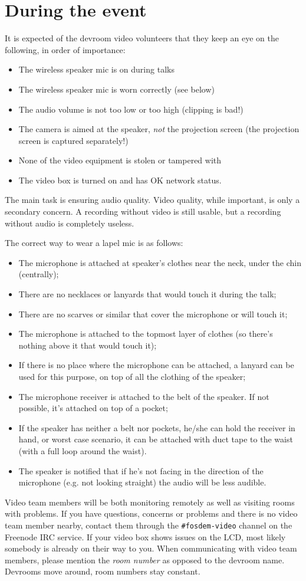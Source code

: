 \documentclass{article}
\begin{document}
\section{During the event}
It is expected of the devroom video volunteers that they keep an eye on the following, in order of importance:
\begin{itemize}
  \item The wireless speaker mic is on during talks
  \item The wireless speaker mic is worn correctly (see below)
  \item The audio volume is not too low or too high (clipping is bad!)
  \item The camera is aimed at the speaker, \emph{not} the projection screen (the projection screen is captured separately!)
  \item None of the video equipment is stolen or tampered with
  \item The video box is turned on and has OK network status.
\end{itemize}
The main task is ensuring audio quality. Video quality, while important, is only a secondary concern. A recording without video is still usable, but a recording without audio is completely useless.

The correct way to wear a lapel mic is as follows:
\begin{itemize}
  \item The microphone is attached at speaker's clothes near the neck, under the chin (centrally);
  \item There are no necklaces or lanyards that would touch it during the talk;
  \item There are no scarves or similar that cover the microphone or will touch it;
  \item The microphone is attached to the topmost layer of clothes (so there's nothing above it that would touch it);
  \item If there is no place where the microphone can be attached, a lanyard can be used for this purpose, on top of all the clothing of the speaker;
  \item The microphone receiver is attached to the belt of the speaker. If not possible, it's attached on top of a pocket;
  \item If the speaker has neither a belt nor pockets, he/she can hold the receiver in hand, or worst case scenario, it can be attached with duct tape to the waist (with a full loop around the waist).
  \item The speaker is notified that if he's not facing in the direction of the microphone (e.g. not looking straight) the audio will be less audible.
\end{itemize}

Video team members will be both monitoring remotely as well as visiting rooms with problems. If you have questions, concerns or problems and there is no video team member nearby, contact them through the \texttt{\#fosdem-video} channel on the Freenode IRC service. If your video box shows issues on the LCD, most likely somebody is already on their way to you. When communicating with video team members, please mention the \emph{room number} as opposed to the devroom name. Devrooms move around, room numbers stay constant.
\end{document}
